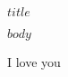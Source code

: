 \documentclass[12pt]{article} %
\begin{document}
\color{text1} %


\begin{center}
{ $title$} \\
\date{$author$}
\end{center}

\raggedright

$body$

\hspace{300pt} I love you \signature{Daddy}
\end{document}
